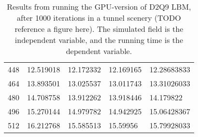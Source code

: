 \begin{table}[H]
\begin{tabular}{lllll}
448&	12.519018&	12.172332&	12.169165&	12.28683833\\
464&	13.893501&	13.025537&	13.011743&	13.31026033\\
480&	14.708758&	13.912262&	13.918446&	14.179822\\
496&	15.270144&	14.979782&	14.942925&	15.06428367\\
512&	16.212768&	15.585513&	15.59956	&	15.79928033\\
\bottomrule
\end{tabular}
\caption{Results from running the GPU-version of D2Q9 LBM, after 1000 iterations in a tunnel scenery (TODO reference a figure here). The simulated field is the independent variable, and the running time is the dependent variable.}
\label{resultgpu}
\end{table}